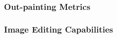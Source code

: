 \documentclass{article}
\begin{document}
\subsubsection{Out-painting Metrics}

\subsubsection{Image Editing Capabilities}
\end{document}
